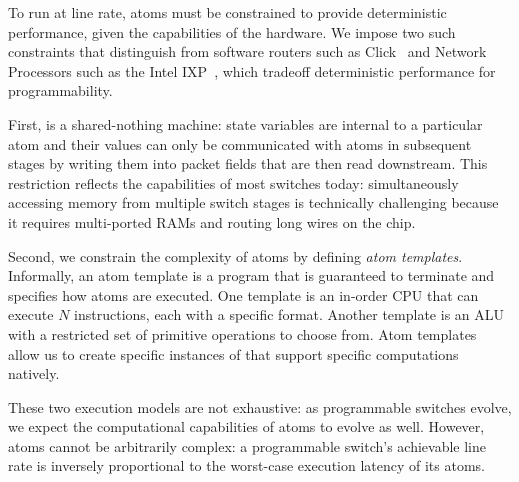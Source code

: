To run at line rate, atoms must be constrained to
provide deterministic performance, given the capabilities of the hardware. We
impose two such constraints that distinguish \absmachine from software routers
such as Click~\cite{click} and Network Processors such as the Intel
IXP~\cite{ixp4xx}, which tradeoff deterministic performance for
programmability.

First, \absmachine is a shared-nothing machine: state variables are
internal to a particular atom and their values can only be
communicated with atoms in subsequent stages by writing them into
packet fields that are then read downstream.  This restriction
reflects the capabilities of most switches today: simultaneously
accessing memory from multiple switch stages is technically
challenging because it requires multi-ported RAMs and routing long
wires on the chip.

Second, we constrain the complexity of atoms by defining {\it atom templates}.
Informally, an atom template is a program that is guaranteed to terminate and
specifies how atoms are executed. One template is an in-order CPU that can
execute $N$ instructions, each with a specific format. Another template is an
ALU with a restricted set of primitive operations to choose from. Atom
templates allow us to create specific instances of \absmachine that support
specific computations natively.

These two execution models are not exhaustive: as programmable switches evolve,
we expect the computational capabilities of atoms to evolve as well. However,
atoms cannot be arbitrarily complex: a programmable switch's achievable line
rate is inversely proportional to the worst-case execution latency of its
atoms.
